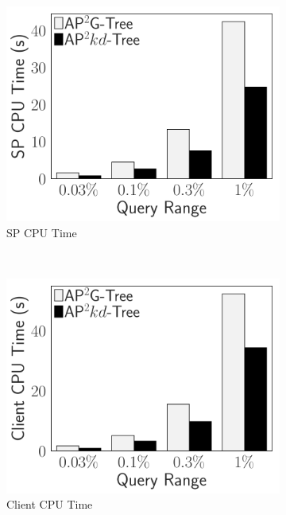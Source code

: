 \begin{figure}[t]
    \centering
    \begin{subfigure}{.33\linewidth}
        \includegraphics[width=\linewidth]{exp-figs/access-control/index_1_sp.pdf}
        \caption{SP CPU Time}
    \end{subfigure}~%
    \begin{subfigure}{.33\linewidth}
        \includegraphics[width=\linewidth]{exp-figs/access-control/index_1_user.pdf}
        \caption{Client CPU Time}
    \end{subfigure}~%
    \begin{subfigure}{.33\linewidth}

\end{subfigure}
\end{figure}

